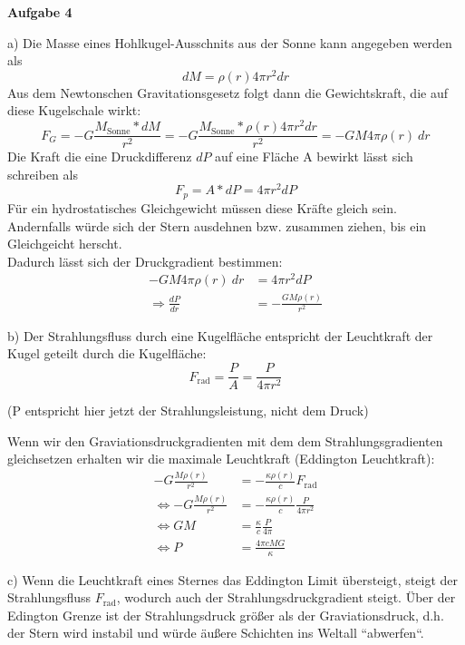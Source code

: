 \documentclass[11pt, a4paper]{article}
\begin{document}
\thispagestyle{fancy}
{\large\textbf{Aufgabe 4}}
\par{a)}
Die Masse eines Hohlkugel-Ausschnits aus der Sonne kann angegeben werden als
\[
	dM = \rho(r) 4\pi r^2 dr
\]
Aus dem Newtonschen Gravitationsgesetz folgt dann die Gewichtskraft, die
auf diese Kugelschale wirkt:
\[
	F_G = -G \frac{M_{\text{Sonne}} * dM}{r^2} 
	= -G \frac{M_{\text{Sonne}} * \rho(r) 4\pi r^2 dr}{r^2}
	= -GM 4\pi \rho(r) \ dr
\]
Die Kraft die eine Druckdifferenz $dP$ auf eine Fläche A bewirkt lässt sich 
schreiben als
\[
	F_p = A * dP = 4\pi r^2 dP
\]
Für ein hydrostatisches Gleichgewicht müssen diese Kräfte gleich sein.
Andernfalls würde sich der Stern ausdehnen bzw. zusammen ziehen, bis ein 
Gleichgeicht herscht.\\
Dadurch lässt sich der Druckgradient bestimmen:
\begin{align*}
	-GM 4\pi \rho(r) \ dr
	&= 4\pi r^2 dP \\
	\Rightarrow
	\frac{dP}{dr} &= -\frac{GM \rho(r)}{r^2}
\end{align*}

\vspace{0.5cm}
\par{b)}
Der Strahlungsfluss durch eine Kugelfläche entspricht der Leuchtkraft 
der Kugel geteilt durch die Kugelfläche:
\[
	F_{\text{rad}} = \frac{P}{A} = \frac{P}{4\pi r^2}
\]
\begin{center}
	{\footnotesize{(P entspricht hier jetzt  der Strahlungsleistung, 
	nicht dem Druck)}}
\end{center}
Wenn wir den Graviationsdruckgradienten mit dem dem Strahlungsgradienten 
gleichsetzen
erhalten wir die maximale Leuchtkraft (Eddington Leuchtkraft):
\begin{align*}
	-G \frac{M\rho(r)}{r^2} 
	&= -\frac{\kappa\rho(r)}{c} F_{\text{rad}} \\
	\Leftrightarrow
	-G \frac{M\rho(r)}{r^2} 
	&= -\frac{\kappa\rho(r)}{c} \frac{P}{4\pi r^2} \\
	\Leftrightarrow
	GM
	&= \frac{\kappa}{c} \frac{P}{4\pi} \\
	\Leftrightarrow
	P
	&= \frac{4\pi c M G}{\kappa}
\end{align*}

\vspace{0.5cm}
\par{c)}
Wenn die Leuchtkraft eines Sternes das Eddington Limit übersteigt, steigt 
der Strahlungsfluss $F_\text{rad}$, wodurch auch der Strahlungsdruckgradient
steigt. Über der Edington Grenze ist der Strahlungsdruck größer als der
Graviationsdruck, d.h. der Stern wird instabil und würde äußere Schichten 
ins Weltall ``abwerfen``.
\end{document}
